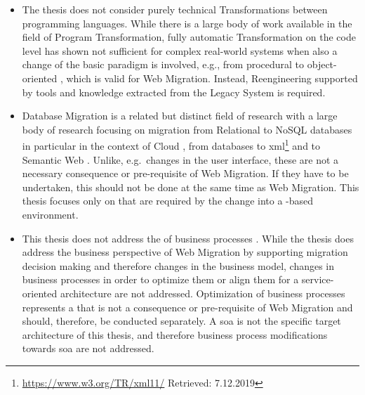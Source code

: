 \begin{itemize}
\tightlist
\item
  The thesis does not consider purely technical \glspl{Transformation} between programming languages.
While there is a large body of work available in the field of Program \gls{Transformation}, fully automatic \gls{Transformation} on the code level \autocite[cf.~family F1 in][]{Razavian2013PHD} has shown not sufficient for complex real-world systems when also a change of the basic paradigm is involved, e.g., from procedural to object-oriented \autocite{Sneed2010SoftwareMigration}, which is valid for \gls{Web Migration}.
Instead, \gls{Reengineering} \autocite{ISO/IEEE24765Vocabulary,IEEE1219Maintenance} supported by tools and knowledge extracted from the \gls{Legacy System} is required.
\item
  Database Migration is a related but distinct field of research with a large body of research focusing on migration from Relational to NoSQL databases \autocite{Karnitis2015,Zhao2014a,Rocha2015RelationalNoSQL} in particular in the context of Cloud \autocite{Strauch2013}, from databases to \gls{xml}\footnote{\url{https://www.w3.org/TR/xml11/} Retrieved: 7.12.2019} \autocite{Li2014,Tzvetkov2005} and to Semantic Web \autocite{Vavliakis2013,Vavliakis2011,XuanFan2010}.
Unlike, e.g.~changes in the user interface, these  are not a necessary consequence or pre-requisite of \gls{Web Migration}.
If they have to be undertaken, this should not be done at the same time as \gls{Web Migration}.
This thesis focuses only on  that are required by the change into a -based environment.
\item
  This thesis does not address the  of business processes \autocite[cf.~ADM Business Domain modernization@Perez-Castillo2011KDM; and family F3 in][]{Razavian2013PHD}.
While the thesis does address the business perspective of \gls{Web Migration} by supporting migration decision making and therefore changes in the business model, changes in business processes in order to optimize them or align them for a service-oriented architecture \autocite{Razavian2013PHD,Razavian2010SAPIENSA,Nguyen2009} are not addressed.
Optimization of business processes represents a  that is not a consequence or pre-requisite of \gls{Web Migration} and should, therefore, be conducted separately.
A \gls{soa} is not the specific target architecture of this thesis, and therefore business process modifications towards \gls{soa} are not addressed.

\end{itemize}
